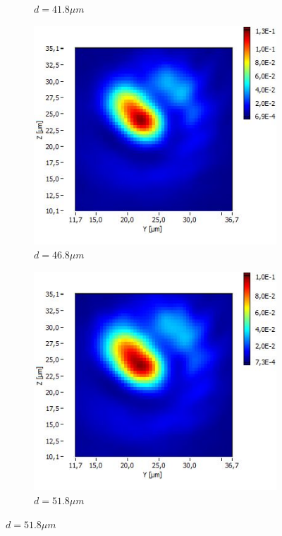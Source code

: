 \documentclass[a4paper,11pt]{article}
\begin{document}
\begin{figure}[htb]
\begin{subfigure}[b]{.20\linewidth}
    \caption{$d=41.8\mu m$}
  \end{subfigure}
  \begin{subfigure}[b]{.20\linewidth}
    \centering
    \includegraphics[width=\textwidth]{Fibre5/scan_033_g1.jpg}
    \caption{$d=46.8\mu m$}
  \end{subfigure}
  \hspace{8mm}
  \begin{subfigure}[b]{.20\linewidth}
    \centering
    \includegraphics[width=\textwidth]{Fibre5/scan_034_g1.jpg}
    \caption{$d=51.8\mu m$}
  \end{subfigure}
\end{figure}
\end{document}
